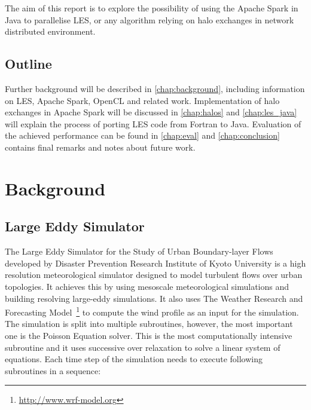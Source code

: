 \documentclass{l4proj}
\begin{document}
The aim of this report is to explore the possibility of using the Apache Spark in Java to parallelise
LES, or any algorithm relying on halo exchanges in network distributed environment.

\section{Outline}

Further background will be described in \autoref{chap:background}, including information
on LES, Apache Spark, OpenCL and related work. Implementation of halo exchanges in 
Apache Spark will be discussed in \autoref{chap:halos} and \autoref{chap:les_java} will
explain the process of porting LES code from Fortran to Java. Evaluation of the achieved
performance can be found in \autoref{chap:eval} and \autoref{chap:conclusion} contains
final remarks and notes about future work.

\chapter{Background}
\label{chap:background}

\section{Large Eddy Simulator}

The Large Eddy Simulator for the Study of Urban Boundary-layer Flows developed by
Disaster Prevention Research Institute of Kyoto University is a high resolution
meteorological simulator designed to model turbulent flows over urban topologies. 
It achieves this by using mesoscale meteorological simulations and building resolving
large-eddy simulations. It also uses The Weather Research and Forecasting Model~\footnote{\url{http://www.wrf-model.org}}
to compute the wind profile as an input for the simulation. The simulation is split into
multiple subroutines, however, the most important one is the Poisson Equation solver.
This is the most computationally intensive subroutine and it uses successive over relaxation to solve
a linear system of equations. Each time step of the simulation needs to execute following subroutines
in a sequence:
\end{document}
